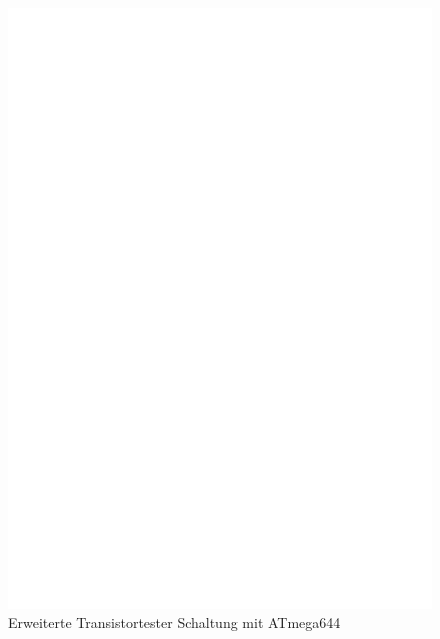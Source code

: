 \begin{figure}[H]
\centering
\includegraphics[width=18cm]{../FIG/t644tester.eps}
\caption{Erweiterte Transistortester Schaltung mit ATmega644}
\label{fig:t644tester}
\end{figure}


